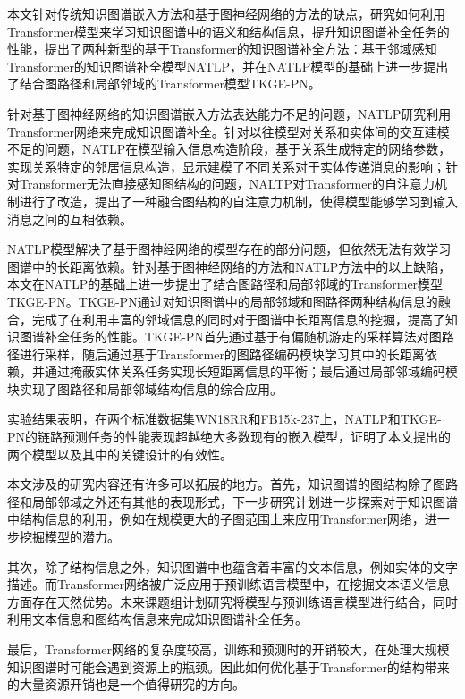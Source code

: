 \summary
本文针对传统知识图谱嵌入方法和基于图神经网络的方法的缺点，研究如何利用Transformer模型来学习知识图谱中的语义和结构信息，提升知识图谱补全任务的性能，提出了两种新型的基于Transformer的知识图谱补全方法：基于邻域感知Transformer的知识图谱补全模型NATLP，并在NATLP模型的基础上进一步提出了结合图路径和局部邻域的Transformer模型TKGE-PN。

针对基于图神经网络的知识图谱嵌入方法表达能力不足的问题，NATLP研究利用Transformer网络来完成知识图谱补全。针对以往模型对关系和实体间的交互建模不足的问题，NATLP在模型输入信息构造阶段，基于关系生成特定的网络参数，实现关系特定的邻居信息构造，显示建模了不同关系对于实体传递消息的影响；针对Transformer无法直接感知图结构的问题，NALTP对Transformer的自注意力机制进行了改造，提出了一种融合图结构的自注意力机制，使得模型能够学习到输入消息之间的互相依赖。

NATLP模型解决了基于图神经网络的模型存在的部分问题，但依然无法有效学习图谱中的长距离依赖。针对基于图神经网络的方法和NATLP方法中的以上缺陷，本文在NATLP的基础上进一步提出了结合图路径和局部邻域的Transformer模型TKGE-PN。TKGE-PN通过对知识图谱中的局部邻域和图路径两种结构信息的融合，完成了在利用丰富的邻域信息的同时对于图谱中长距离信息的挖掘，提高了知识图谱补全任务的性能。TKGE-PN首先通过基于有偏随机游走的采样算法对图路径进行采样，随后通过基于Transformer的图路径编码模块学习其中的长距离依赖，并通过掩蔽实体关系任务实现长短距离信息的平衡；最后通过局部邻域编码模块实现了图路径和局部邻域结构信息的综合应用。

实验结果表明，在两个标准数据集WN18RR和FB15k-237上，NATLP和TKGE-PN的链路预测任务的性能表现超越绝大多数现有的嵌入模型，证明了本文提出的两个模型以及其中的关键设计的有效性。


本文涉及的研究内容还有许多可以拓展的地方。首先，知识图谱的图结构除了图路径和局部邻域之外还有其他的表现形式，下一步研究计划进一步探索对于知识图谱中结构信息的利用，例如在规模更大的子图范围上来应用Transformer网络，进一步挖掘模型的潜力。

其次，除了结构信息之外，知识图谱中也蕴含着丰富的文本信息，例如实体的文字描述。而Transformer网络被广泛应用于预训练语言模型中，在挖掘文本语义信息方面存在天然优势。未来课题组计划研究将模型与预训练语言模型进行结合，同时利用文本信息和图结构信息来完成知识图谱补全任务。

最后，Transformer网络的复杂度较高，训练和预测时的开销较大，在处理大规模知识图谱时可能会遇到资源上的瓶颈。因此如何优化基于Transformer的结构带来的大量资源开销也是一个值得研究的方向。

